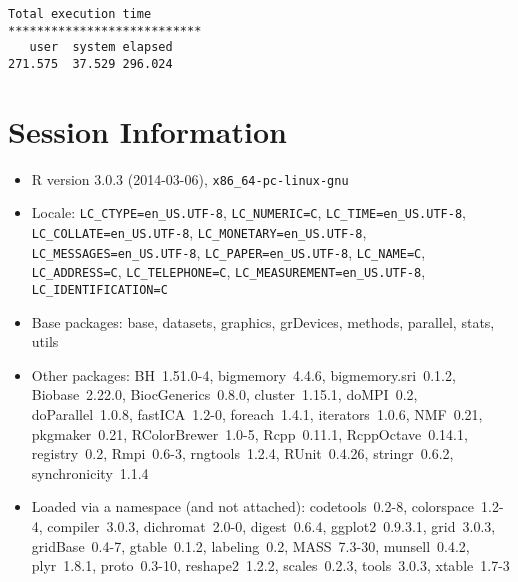 \documentclass[10pt]{article}\usepackage[]{graphicx}\usepackage[]{color}
\begin{document}
\begin{verbatim}
Total execution time
***************************
   user  system elapsed 
271.575  37.529 296.024 

\end{verbatim}

\section*{Session Information}
\begin{itemize}\raggedright
  \item R version 3.0.3 (2014-03-06), \verb|x86_64-pc-linux-gnu|
  \item Locale: \verb|LC_CTYPE=en_US.UTF-8|, \verb|LC_NUMERIC=C|, \verb|LC_TIME=en_US.UTF-8|, \verb|LC_COLLATE=en_US.UTF-8|, \verb|LC_MONETARY=en_US.UTF-8|, \verb|LC_MESSAGES=en_US.UTF-8|, \verb|LC_PAPER=en_US.UTF-8|, \verb|LC_NAME=C|, \verb|LC_ADDRESS=C|, \verb|LC_TELEPHONE=C|, \verb|LC_MEASUREMENT=en_US.UTF-8|, \verb|LC_IDENTIFICATION=C|
  \item Base packages: base, datasets, graphics, grDevices, methods,
    parallel, stats, utils
  \item Other packages: BH~1.51.0-4, bigmemory~4.4.6,
    bigmemory.sri~0.1.2, Biobase~2.22.0, BiocGenerics~0.8.0,
    cluster~1.15.1, doMPI~0.2, doParallel~1.0.8, fastICA~1.2-0,
    foreach~1.4.1, iterators~1.0.6, NMF~0.21, pkgmaker~0.21,
    RColorBrewer~1.0-5, Rcpp~0.11.1, RcppOctave~0.14.1, registry~0.2,
    Rmpi~0.6-3, rngtools~1.2.4, RUnit~0.4.26, stringr~0.6.2,
    synchronicity~1.1.4
  \item Loaded via a namespace (and not attached): codetools~0.2-8,
    colorspace~1.2-4, compiler~3.0.3, dichromat~2.0-0, digest~0.6.4,
    ggplot2~0.9.3.1, grid~3.0.3, gridBase~0.4-7, gtable~0.1.2,
    labeling~0.2, MASS~7.3-30, munsell~0.4.2, plyr~1.8.1, proto~0.3-10,
    reshape2~1.2.2, scales~0.2.3, tools~3.0.3, xtable~1.7-3
\end{itemize}
\end{document}
